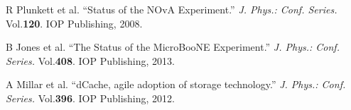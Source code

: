 \documentclass{PoS}
\begin{document}
\begin{thebibliography}{99}
R Plunkett et al.  ``Status of the NOvA Experiment.''  \textit{J. Phys.: Conf. Series.} Vol.\textbf{120}. IOP Publishing, 2008.



B Jones et al.  ``The Status of the MicroBooNE Experiment.''  \textit{J. Phys.: Conf. Series.} Vol.\textbf{408}. IOP Publishing, 2013.


A Millar et al.  ``dCache, agile adoption of storage technology.''  \textit{J. Phys.: Conf. Series.} Vol.\textbf{396}. IOP Publishing, 2012.



\end{thebibliography}
\end{document}
